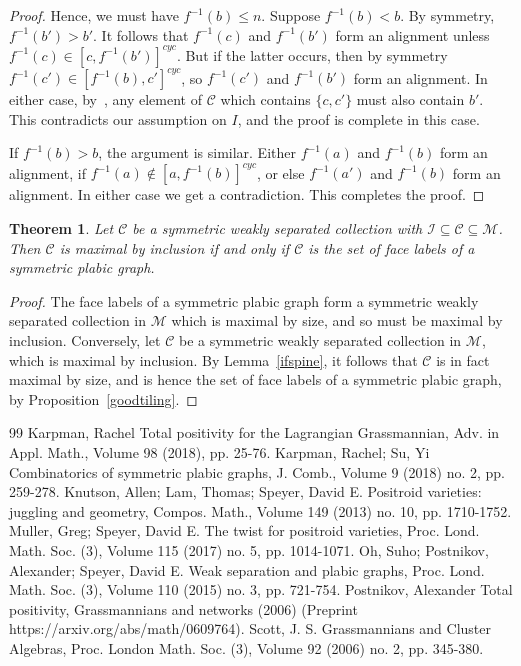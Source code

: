 \documentclass[10pt]{amsart}
\newtheorem{theo}{Theorem}[section]
\theoremstyle{definition}
\begin{document}
\begin{proof}
Hence, we must have $f^{-1}(b) \leq n$. 
Suppose $f^{-1}(b) < b$. By symmetry, $f^{-1}(b') > b'$. 
It follows that $f^{-1}(c)$ and $f^{-1}(b')$ form an alignment unless $ f^{-1}(c) \in [c, f^{-1}(b')]^{cyc}$. 
But if the latter occurs, then by symmetry $f^{-1}(c') \in [f^{-1}(b), c']^{cyc}$, so $f^{-1}(c')$ and $f^{-1}(b')$ form an alignment. In either case, by~\cite[Corollary 11.3]{OPS15}, any element of $\mathcal{C}$ which contains $\{c,c'\}$ must also contain $b'$. This contradicts our assumption on $I$, and the proof is complete in this case.

If $f^{-1}(b) > b$, the argument is similar. Either $f^{-1}(a)$ and $f^{-1}(b)$ form an alignment, if $f^{-1}(a) \not\in [a, f^{-1}(b)]^{cyc}$, or else $f^{-1}(a')$ and $f^{-1}(b)$ form an alignment. In either case we get a contradiction. This completes the proof. \end{proof}

\begin{theo}
\label{main}
Let $\mathcal{C}$ be a symmetric weakly separated collection with $\mathcal{I} \subseteq \mathcal{C} \subseteq \mathcal{M}$. Then $\mathcal{C}$ is maximal by inclusion if and only if $\mathcal{C}$ is the set of face labels of a symmetric plabic graph. 
\end{theo}
\begin{proof}
The face labels of a symmetric plabic graph form a symmetric weakly separated collection in $\mathcal{M}$ which is maximal by size, and so must be maximal by inclusion. Conversely, let $\mathcal{C}$ be a symmetric weakly separated collection in $\mathcal{M}$, which is maximal by inclusion. By Lemma~\ref{ifspine}, it follows that $\mathcal{C}$ is in fact maximal by size, and is hence the set of face labels of a symmetric plabic graph, by Proposition~\ref{goodtiling}.\end{proof} 
\begin{thebibliography}{99}
 Karpman, Rachel Total positivity for the Lagrangian Grassmannian, Adv. in Appl. Math., Volume 98 (2018), pp. 25-76.
 Karpman, Rachel; Su, Yi Combinatorics of symmetric plabic graphs, J. Comb., Volume 9 (2018) no. 2, pp. 259-278.
 Knutson, Allen; Lam, Thomas; Speyer, David E. Positroid varieties: juggling and geometry, Compos. Math., Volume 149 (2013) no. 10, pp. 1710-1752.
 Muller, Greg; Speyer, David E. The twist for positroid varieties, Proc. Lond. Math. Soc. (3), Volume 115 (2017) no. 5, pp. 1014-1071.
 Oh, Suho; Postnikov, Alexander; Speyer, David E. Weak separation and plabic graphs, Proc. Lond. Math. Soc. (3), Volume 110 (2015) no. 3, pp. 721-754.
 Postnikov, Alexander Total positivity, Grassmannians and networks (2006) (Preprint https://arxiv.org/abs/math/0609764).
 Scott, J. S. Grassmannians and Cluster Algebras, Proc. London Math. Soc. (3), Volume 92 (2006) no. 2, pp. 345-380.
\end{thebibliography}
\end{document}
